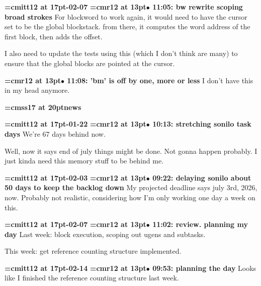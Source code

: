 {\medskip\noindent\bf\font\titlefont=cmitt12 at 17pt-02-07}\medskip
{\smallskip\noindent\bf\font\titlefont=cmr12 at 13pt\titlefont $\bullet$ 11:05: bw rewrite scoping broad strokes}\smallskip
For blockword to work again, it would need to have the cursor set to be the global blockstack. from there, it computes the word address of the first block, then adds the offset.
\par

I also need to update the tests using this (which I don't think are many) to ensure that the global blocks are pointed at the cursor.
\par

{\smallskip\noindent\bf\font\titlefont=cmr12 at 13pt\titlefont $\bullet$ 11:08: 'bm' is off by one, more or less}\smallskip
I don't have this in my head anymore.
\par

{\medskip\noindent\bf\font\titlefont=cmss17 at 20pt\titlefont news}\medskip

{\medskip\noindent\bf\font\titlefont=cmitt12 at 17pt-01-22}\medskip
{\smallskip\noindent\bf\font\titlefont=cmr12 at 13pt\titlefont $\bullet$ 10:13: stretching sonilo task days}\smallskip
We're 67 days behind now.
\par

Well, now it says end of july things might be done. Not gonna happen probably. I just kinda need this memory stuff to be behind me.
\par

{\medskip\noindent\bf\font\titlefont=cmitt12 at 17pt-02-03}\medskip
{\smallskip\noindent\bf\font\titlefont=cmr12 at 13pt\titlefont $\bullet$ 09:22: delaying sonilo about 50 days to keep the backlog down}\smallskip
My projected deadline says july 3rd, 2026, now. Probably not realistic, considering how I'm only working one day a week on this.
\par

{\medskip\noindent\bf\font\titlefont=cmitt12 at 17pt-02-07}\medskip
{\smallskip\noindent\bf\font\titlefont=cmr12 at 13pt\titlefont $\bullet$ 11:02: review. planning my day}\smallskip
Last week: block execution, scoping out ugens and subtasks.
\par

This week: get reference counting structure implemented.
\par

{\medskip\noindent\bf\font\titlefont=cmitt12 at 17pt-02-14}\medskip
{\smallskip\noindent\bf\font\titlefont=cmr12 at 13pt\titlefont $\bullet$ 09:53: planning the day}\smallskip
Looks like I finished the reference counting structure last week.
\par

